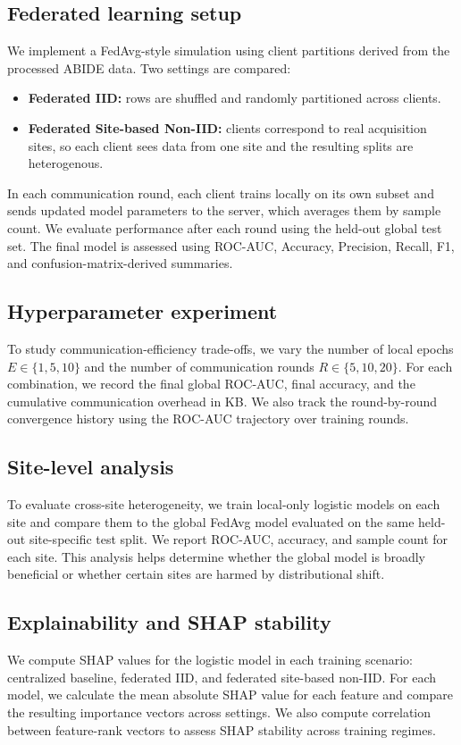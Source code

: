 \documentclass[sigconf]{acmart}
\begin{document}
\subsection{Federated learning setup}
We implement a FedAvg-style simulation using client partitions derived from the processed ABIDE data. Two settings are compared:

\begin{itemize}[leftmargin=*]
    \item \textbf{Federated IID:} rows are shuffled and randomly partitioned across clients.
    \item \textbf{Federated Site-based Non-IID:} clients correspond to real acquisition sites, so each client sees data from one site and the resulting splits are heterogenous.
\end{itemize}

In each communication round, each client trains locally on its own subset and sends updated model parameters to the server, which averages them by sample count. We evaluate performance after each round using the held-out global test set. The final model is assessed using ROC-AUC, Accuracy, Precision, Recall, F1, and confusion-matrix-derived summaries.

\subsection{Hyperparameter experiment}
To study communication-efficiency trade-offs, we vary the number of local epochs $E \in \{1, 5, 10\}$ and the number of communication rounds $R \in \{5, 10, 20\}$. For each combination, we record the final global ROC-AUC, final accuracy, and the cumulative communication overhead in KB. We also track the round-by-round convergence history using the ROC-AUC trajectory over training rounds.

\subsection{Site-level analysis}
To evaluate cross-site heterogeneity, we train local-only logistic models on each site and compare them to the global FedAvg model evaluated on the same held-out site-specific test split. We report ROC-AUC, accuracy, and sample count for each site. This analysis helps determine whether the global model is broadly beneficial or whether certain sites are harmed by distributional shift.

\subsection{Explainability and SHAP stability}
We compute SHAP values for the logistic model in each training scenario: centralized baseline, federated IID, and federated site-based non-IID. For each model, we calculate the mean absolute SHAP value for each feature and compare the resulting importance vectors across settings. We also compute correlation between feature-rank vectors to assess SHAP stability across training regimes.
\end{document}
